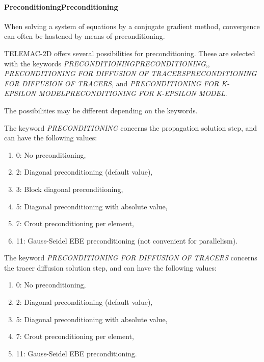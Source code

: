 \documentclass{article} %
\begin{document}
\paragraph{ PreconditioningPreconditioning}

 When solving a system of equations by a conjugate gradient method, convergence can often be hastened by means of preconditioning.

 TELEMAC-2D offers several possibilities for preconditioning. These are selected with the keywords \textit{PRECONDITIONINGPRECONDITIONING},, \textit{PRECONDITIONING FOR DIFFUSION OF TRACERSPRECONDITIONING FOR DIFFUSION OF TRACERS}, and \textit{PRECONDITIONING FOR K-EPSILON MODELPRECONDITIONING FOR K-EPSILON MODEL}.

 The possibilities may be different depending on the keywords.

 The keyword \textit{PRECONDITIONING} concerns the propagation solution step, and can have the following values:

\begin{enumerate}
\item  0: No preconditioning,

\item  2: Diagonal preconditioning (default value),

\item  3: Block diagonal preconditioning,

\item  5: Diagonal preconditioning with absolute value,

\item  7: Crout preconditioning per element,

\item  11: Gauss-Seidel EBE preconditioning (not convenient for parallelism).
\end{enumerate}

 The keyword \textit{PRECONDITIONING FOR DIFFUSION OF TRACERS} concerns the tracer diffusion solution step, and can have the following values:

\begin{enumerate}
\item  0: No preconditioning,

\item  2: Diagonal preconditioning (default value),

\item  5: Diagonal preconditioning with absolute value,

\item  7: Crout preconditioning per element,

\item  11: Gauss-Seidel EBE preconditioning.
\end{enumerate}
\end{document}
